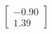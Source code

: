 \documentclass[preview]{standalone}
\begin{document}
\begin{align*}
\begin{bmatrix} -0.90 \\ 1.39 \end{bmatrix}
\end{align*}
\end{document}
